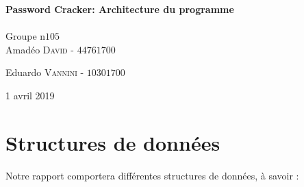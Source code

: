\documentclass{article}
\begin{document}
\begin{titlepage}
	{\huge\bfseries Password Cracker: Architecture du programme}\\[0.4cm] %
	
	\HRule\\[1.5cm]
	
	
	Groupe n\degree$105$\\[0.2cm]
	Amadéo \textsc{David}  - $44761700$%
	
	Eduardo \textsc{Vannini} - $10301700$%
	
	
	\vfill\vfill\vfill %
	
	{\large 1\ier{} avril 2019} %
	
	
	\vfill %
	
\end{titlepage}


\section{Structures de données}
\label{sec:data_structures}

	\noindent
	Notre rapport comportera différentes structures de données, à savoir :
	
\end{document}
